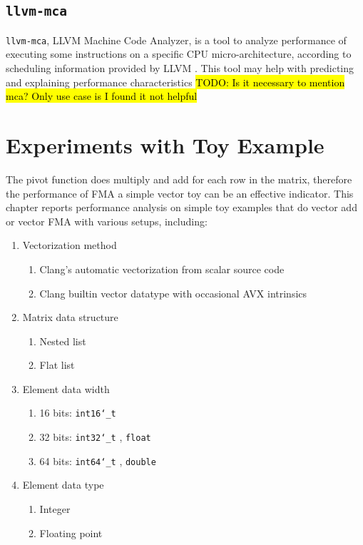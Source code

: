 \documentclass[logo,bsc,singlespacing,parskip]{infthesis}
\newcommand{\dtshort}{\texttt{int16\char`_t} }
\newcommand{\dtint}{\texttt{int32\char`_t} }
\newcommand{\dtlong}{\texttt{int64\char`_t} }
\newcommand{\dtfloat}{\texttt{float} }
\newcommand{\dtdouble}{\texttt{double} }
\newenvironment{compactlist}
{ \begin{enumerate}
    \setlength{\itemsep}{0pt}
    \setlength{\parskip}{0pt}
    \setlength{\parsep}{0pt}     
}
{ \end{enumerate} }
\begin{document}
\section{\texttt{llvm-mca}}

\texttt{llvm-mca}, LLVM Machine Code Analyzer, is a tool to analyze performance of
executing some instructions on a specific CPU micro-architecture, according to
scheduling information provided by LLVM \cite{llvm-mca}. This tool may help with predicting and
explaining performance characteristics \hl{TODO: Is it necessary to mention mca?
Only use case is I found it not helpful}


\chapter{Experiments with Toy Example}
\label{sec:Toy}

The pivot function does multiply and add for each row in the matrix, therefore
the performance of FMA a simple vector toy can be an effective indicator. This
chapter reports performance analysis on simple toy examples that do vector add
or vector FMA with various setups, including: 

\begin{enumerate} 
    \item Vectorization method 
        \begin{compactlist} 
            \item Clang's automatic vectorization from scalar source code
            \item Clang builtin vector datatype with occasional AVX intrinsics 
        \end{compactlist}
    \item Matrix data structure 
        \begin{compactlist} 
            \item Nested list
            \item Flat list
        \end{compactlist}
    \item Element data width
        \begin{compactlist} 
            \item 16 bits: \dtshort
            \item 32 bits: \dtint, \dtfloat
            \item 64 bits: \dtlong, \dtdouble
        \end{compactlist}
    \item Element data type 
        \begin{compactlist} 
            \item Integer
            \item Floating point
        \end{compactlist}
\end{enumerate}
\end{document}
